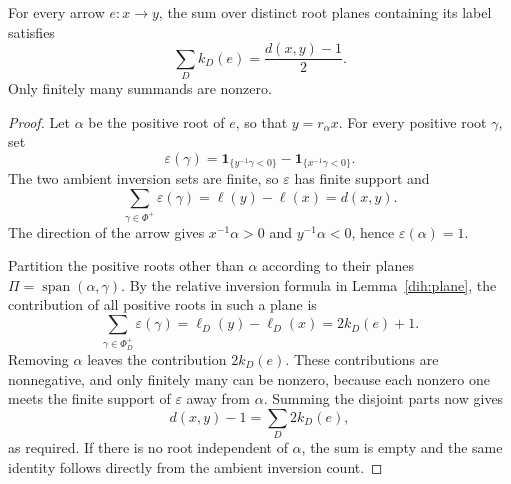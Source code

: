 \begin{lemma}\label{dih:sum}
For every arrow $e:x\to y$, the sum over distinct root planes
containing its label satisfies
\begin{equation}\label{eq:sum}
 \sum_D k_D(e)=\frac{d(x,y)-1}{2}.
\end{equation}
Only finitely many summands are nonzero.
\end{lemma}

\begin{proof}
Let $\alpha$ be the positive root of $e$, so that
$y=r_\alpha x$.  For every positive root $\gamma$, set
\[
 \varepsilon(\gamma)
 =\mathbf{1}_{\{y^{-1}\gamma<0\}}
  -\mathbf{1}_{\{x^{-1}\gamma<0\}}.
\]
The two ambient inversion sets are finite, so
$\varepsilon$ has finite support and
\[
 \sum_{\gamma\in\Phi^+}\varepsilon(\gamma)
 =\ell(y)-\ell(x)=d(x,y).
\]
The direction of the arrow gives $x^{-1}\alpha>0$ and
$y^{-1}\alpha<0$, hence $\varepsilon(\alpha)=1$.

Partition the positive roots other than $\alpha$ according
to their planes $\Pi=\operatorname{span}(\alpha,\gamma)$.
By the relative inversion formula in Lemma~\ref{dih:plane},
the contribution of all positive roots in such a plane is
\[
 \sum_{\gamma\in\Phi_D^+}\varepsilon(\gamma)
 =\ell_D(y)-\ell_D(x)=2k_D(e)+1.
\]
Removing $\alpha$ leaves the contribution $2k_D(e)$.
These contributions are nonnegative, and only finitely many
can be nonzero, because each nonzero one meets the finite
support of $\varepsilon$ away from $\alpha$.  Summing the
disjoint parts now gives
\[
 d(x,y)-1=\sum_D 2k_D(e),
\]
as required.  If there is no root independent of $\alpha$,
the sum is empty and the same identity follows directly
from the ambient inversion count.
\end{proof}
